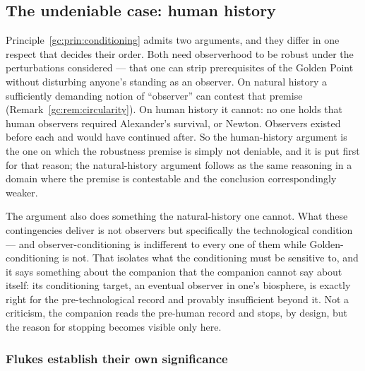 \subsection{The undeniable case: human history}\label{gc:sub:humanhistory}

Principle~\ref{gc:prin:conditioning} admits two arguments, and they
differ in one respect that decides their order. Both need observerhood
to be robust under the perturbations considered --- that one can strip
prerequisites of the Golden Point without disturbing anyone's standing
as an observer. On natural history a sufficiently demanding notion of
``observer'' can contest that premise (Remark~\ref{gc:rem:circularity}).
On human history it cannot: no one holds that human observers required
Alexander's survival, or Newton. Observers existed
before each and would have continued after. So the human-history
argument is the one on which the robustness premise is simply not
deniable, and it is put first for that reason; the natural-history
argument follows as the same reasoning in a domain where the premise is
contestable and the conclusion correspondingly weaker.

The argument also does something the natural-history one cannot. What
these contingencies deliver is not observers but specifically the
technological condition --- and observer-conditioning is indifferent to
every one of them while Golden-conditioning is not. That isolates what
the conditioning must be sensitive to, and it says something about the
companion that the companion cannot say about itself: its
conditioning target, an eventual observer in one's biosphere, is exactly
right for the pre-technological record and provably insufficient beyond
it. Not a criticism, the companion reads the pre-human record and
stops, by design, but the reason for stopping becomes visible only
here.

\subsubsection{Flukes establish their own significance}
\label{gc:subsub:flukes}

